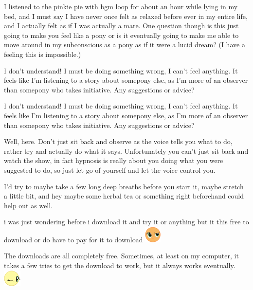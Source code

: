 \documentclass[ebook,12pt,oneside,openany]{memoir}
\newcommand{\mytexttilde}{\raisebox{0.5ex}{\texttildelow}}
\begin{document}
\begin{tcolorbox}[title=Dasher]
\par{I listened to the pinkie pie with bgm loop for about an hour while lying in my bed, and I must say I have never once felt as relaxed before ever in my entire life, and I actually felt as if I was actually a mare. One question though is this just going to make you feel like a pony or is it eventually going to make me able to move around in my subconscious as a pony as if it were a lucid dream? (I have a feeling this is impossible.)}
\end{tcolorbox}
\begin{tcolorbox}[title=Opalicious,colback=violet!5!white,colframe=violet!75!black,coltitle=white]
\par{I don't understand! I must be doing something wrong, I can't feel anything. It feels like I'm listening to a story about somepony else, as I'm more of an observer than somepony who takes initiative. Any suggestions or advice?}
\end{tcolorbox}
\begin{tcolorbox}[title=Lord Bababa,colback=red!5!white,colframe=red!75!black,coltitle=white]
\begin{tcolorbox}[title=Opalicious]
\par{I don't understand! I must be doing something wrong, I can't feel anything. It feels like I'm listening to a story about somepony else, as I'm more of an observer than somepony who takes initiative. Any suggestions or advice?}
\end{tcolorbox}
\par{Well, here. Don't just sit back and observe as the voice tells you what to do, rather try and actually do what it says. Unfortunately you can't just sit back and watch the show, in fact hypnosis is really about you doing what you were suggested to do, so just let go of yourself and let the voice control you.}
\newline{}
\par{I'd try to maybe take a few long deep breaths before you start it, maybe stretch a little bit, and hey maybe some herbal tea or something right beforehand could help out as well.}
\end{tcolorbox}
\begin{tcolorbox}[title=Sleepykitty]
\begin{tcolorbox}[title=\mytexttilde{}TheStealthyPony\mytexttilde{}]
\par{i was just wondering before i download it and try it or anything but it this free to download or do have to pay for it to download \includegraphics{images/mlp_huh.png}}
\end{tcolorbox}
\par{The downloads are all completely free. Sometimes, at least on my computer, it takes a few tries to get the download to work, but it always works eventually. \includegraphics{images/mlp_wink.png}}
\end{tcolorbox}
\end{document}
